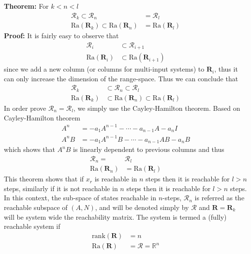 \documentclass[twoside]{article}
\begin{document}
\textbf{Theorem:} For $k < n < l$
%
\begin{align*}
 \mathcal{R}_k \subset \mathcal{R}_{n} &= \mathcal{R}_{l} 
  \\
  \mathrm{Ra} ( \mathbf{R}_k ) \subset \mathrm{Ra} ( \mathbf{R}_{n} ) &= \mathrm{Ra} ( \mathbf{R}_{l} )
\end{align*}
%
\textbf{Proof:} It is fairly easy to observe that
%
\begin{align*}
\mathcal{R}_i & \subset \mathcal{R}_{i+1} 
\\
\mathrm{Ra} ( \mathbf{R}_i ) & \subset \mathrm{Ra} ( \mathbf{R}_{i+1} )
\end{align*}
%
since we add a new column (or columns for multi-input systems) to $ \mathbf{R}_i$, thus it can only increase the dimension of the range-space. Thus we can conclude that 
%
%
\begin{align*}
 \mathcal{R}_k &\subset \mathcal{R}_{n} \subset \mathcal{R}_{l} 
  \\
  \mathrm{Ra} ( \mathbf{R}_k ) &\subset \mathrm{Ra} ( \mathbf{R}_{n} ) \subset \mathrm{Ra} ( \mathbf{R}_{l} )
\end{align*}
%
In order prove $\mathcal{R}_{n} = \mathcal{R}_{l} $, we simply use the Cayley-Hamilton theorem. 
Based on Cayley-Hamilton theorem 
%
\begin{align*}
 A^n &= -a_1 A^{n-1} - \cdots - a_{n-1} A - a_n I
 \\
 A^n B &= -a_1 A^{n-1} B - \cdots - a_{n-1} A B - a_n B
\end{align*}
%
which shows that $ A^n B$ is linearly dependent to previous columns and thus 
%
%
\begin{align*}
\mathcal{R}_{n} =& \mathcal{R}_{l} 
  \\
\mathrm{Ra} ( \mathbf{R}_{n} ) &= \mathrm{Ra} ( \mathbf{R}_{l} )
\end{align*}
%
This theorem shows that if $x_r$ is reachable in $n$ steps then it is reachable for $l > n$ steps, similarly if it is not reachable in 
$n$ steps then it is reachable for $l > n$ steps. In this context, the sub-space of states reachable in $n$-steps, $\mathcal{R}_n$
is referred as the reachable subspace of $(A,N)$, and will be denoted simply by $\mathcal{R}$ and $\mathbf{R} = \mathbf{R}_k$ will be system 
wide the reachability matrix. The system is termed a (fully) reachable system if 
%
\begin{align*}
 \mathrm{rank} (\mathbf{R}) &= n 
 \\
 \mathrm{Ra} (\mathbf{R}) &= \mathcal{R} = \mathbb{R}^n
\end{align*}



\end{document}
